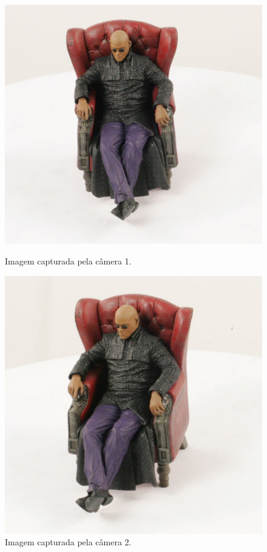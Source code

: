 \documentclass{bmvc2k}
\begin{document}
\begin{figure}[htb]
\centering
\begin{minipage}[t]{0.35\textwidth}
  \centering
  \includegraphics[width=\linewidth]{figs/MorpheusL.jpg}
  \caption{Imagem capturada pela câmera 1.}
  \label{fig:morpheusL}
\end{minipage}
\begin{minipage}[t]{0.35\textwidth}
  \centering
  \includegraphics[width=\linewidth]{figs/MorpheusR.jpg}
  \caption{Imagem capturada pela câmera 2.}
  \label{fig:morpheusR}
\end{minipage}
\end{figure}
\end{document}

